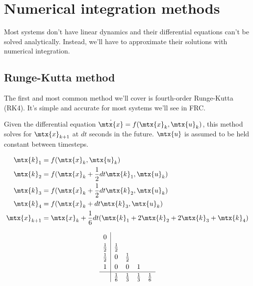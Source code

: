 \section{Numerical integration methods}

Most systems don't have linear dynamics and their differential equations can't
be solved analytically. Instead, we'll have to approximate their solutions with
numerical integration.

\subsection{Runge-Kutta method}

The first and most common method we'll cover is fourth-order Runge-Kutta (RK4).
It's simple and accurate for most systems we'll see in FRC.
\begin{theorem}
  \label{thm:rk4}

  Given the differential equation $\dot{\mtx{x}} = f(\mtx{x}_k, \mtx{u}_k)$,
  this method solves for $\mtx{x}_{k+1}$ at $dt$ seconds in the future.
  $\mtx{u}$ is assumed to be held constant between timesteps.
  \begin{center}
    \begin{minipage}{0.35\linewidth}
      \centering
      \begin{align*}
        \mtx{k}_1 &= f(\mtx{x}_k, \mtx{u}_k) \\
        \mtx{k}_2 &= f(\mtx{x}_k + \frac{1}{2} dt \mtx{k}_1, \mtx{u}_k) \\
        \mtx{k}_3 &= f(\mtx{x}_k + \frac{1}{2} dt \mtx{k}_2, \mtx{u}_k) \\
        \mtx{k}_4 &= f(\mtx{x}_k + dt \mtx{k}_3, \mtx{u}_k) \\
        \mtx{x}_{k+1} &= \mtx{x}_k + \frac{1}{6} dt (\mtx{k}_1 + 2\mtx{k}_2 +
          2\mtx{k}_3 + \mtx{k}_4)
      \end{align*}
    \end{minipage}
    \quad
    \begin{minipage}{0.35\linewidth}
      \centering
      \begin{equation*}
        \renewcommand\arraystretch{1.2}
        \begin{array}{c|cccc}
          0 \\
          \frac{1}{2} & \frac{1}{2} \\
          \frac{1}{2} & 0 & \frac{1}{2} \\
          1 & 0 & 0 & 1 \\
          \hline
          & \frac{1}{6} & \frac{1}{3} & \frac{1}{3} & \frac{1}{6}
        \end{array}
      \end{equation*}
    \end{minipage}
  \end{center}
\end{theorem}

